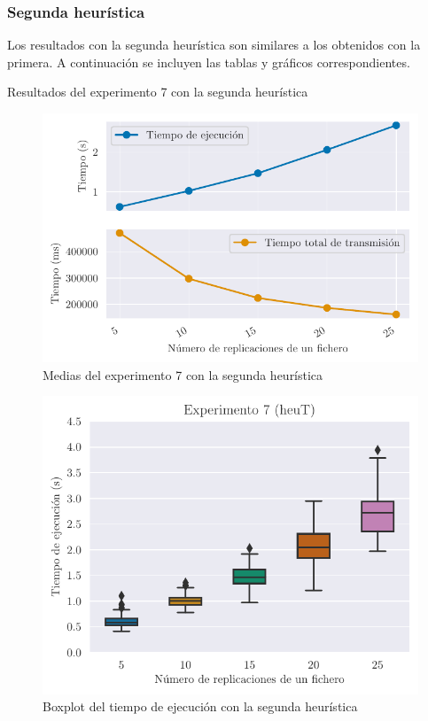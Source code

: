 \subsubsection{Segunda heurística}

Los resultados con la segunda heurística son similares a los obtenidos con la primera. A continuación se incluyen las
tablas y gráficos correspondientes.

\begin{table}[H]
    \centering
    \caption{Resultados del experimento 7 con la segunda heurística}%
    \label{tab:ex7_total}
    \begin{center}
    
    \end{center}
\end{table}

\begin{figure}[H]
    \centering
    \includegraphics{include/plots/ex7_means_n.pdf}
    \caption{Medias del experimento 7 con la segunda heurística}%
    \label{fig:ex7means_total}
\end{figure}

\begin{figure}[H]
    \centering
    \includegraphics{include/plots/ex7_time_bplot_n.pdf}
    \caption{Boxplot del tiempo de ejecución con la segunda heurística}%
    \label{fig:ex7time_total}
\end{figure}

